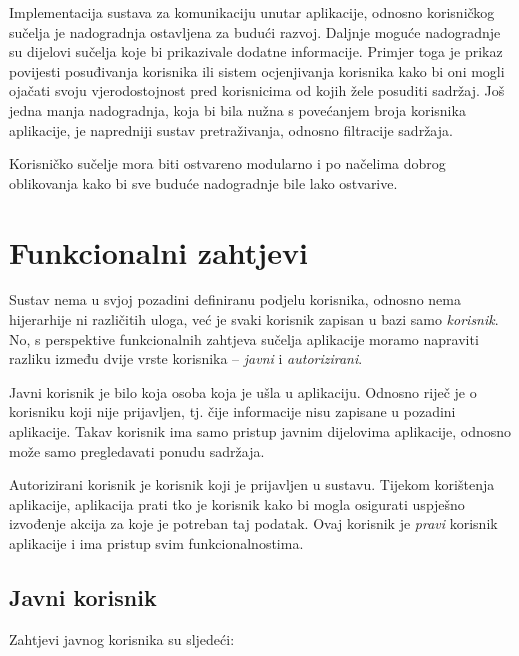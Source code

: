 \documentclass[times, utf8, zavrsni, numeric]{fer}
\newcommand{\razmakp}{\vspace{18pt}}
\newcommand{\razmaks}{\vspace{10pt}}
\begin{document}
\razmakp

Implementacija sustava za komunikaciju unutar aplikacije, odnosno korisničkog sučelja je nadogradnja ostavljena za budući razvoj.
Daljnje moguće nadogradnje su dijelovi sučelja koje bi prikazivale dodatne informacije.
Primjer toga je prikaz povijesti posuđivanja korisnika ili sistem ocjenjivanja korisnika kako bi oni mogli ojačati svoju vjerodostojnost pred korisnicima od kojih žele posuditi sadržaj.
Još jedna manja nadogradnja, koja bi bila nužna s povećanjem broja korisnika aplikacije, je napredniji sustav pretraživanja, odnosno filtracije sadržaja.

Korisničko sučelje mora biti ostvareno modularno i po načelima dobrog oblikovanja kako bi sve buduće nadogradnje bile lako ostvarive.

\razmakp


\section{Funkcionalni zahtjevi}

Sustav nema u svjoj pozadini definiranu podjelu korisnika, odnosno nema hijerarhije ni različitih uloga, već je svaki korisnik zapisan u bazi samo \emph{korisnik}. No, s perspektive funkcionalnih zahtjeva sučelja aplikacije moramo napraviti razliku između dvije vrste korisnika -- \emph{javni} i \emph{autorizirani}.

Javni korisnik je bilo koja osoba koja je ušla u aplikaciju. Odnosno riječ je o korisniku koji nije prijavljen, tj. čije informacije nisu zapisane u pozadini aplikacije. Takav korisnik ima samo pristup javnim dijelovima aplikacije, odnosno može samo pregledavati ponudu sadržaja. 

Autorizirani korisnik je korisnik koji je prijavljen u sustavu. Tijekom korištenja aplikacije, aplikacija prati tko je korisnik kako bi mogla osigurati uspješno izvođenje akcija za koje je potreban taj podatak. Ovaj korisnik je \emph{pravi} korisnik aplikacije i ima pristup svim funkcionalnostima.

\razmaks


\subsection{Javni korisnik}

Zahtjevi javnog korisnika su sljedeći:
\end{document}
